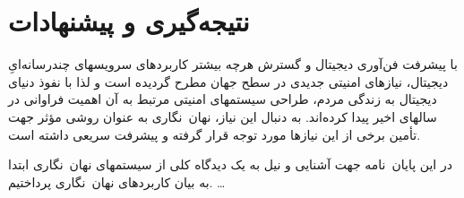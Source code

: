 \chapter{نتیجه‌گیری و پیشنهادات} \label{ch:Conclusion}

با پیشرفت فن‌آوری دیجیتال و گسترش هرچه بیشتر کاربردهای سرویسهای چندرسانه‌ایِ دیجیتال، نیازهای 
امنیتی جدیدی در سطح جهان مطرح گردیده است و لذا با نفوذ دنیای دیجیتال به زندگی مردم، طراحی 
سیستمهای امنیتی مرتبط به آن اهمیت فراوانی در سالهای اخیر پیدا کرده‌اند. به دنبال این نیاز، 
نهان~نگاری به عنوان روشی مؤثر جهت تأمین برخی از این نیازها مورد توجه قرار گرفته و پیشرفت 
سریعی داشته است.

در این پایان~نامه جهت آشنایی و نیل به یک دیدگاه کلی از سیستمهای نهان~نگاری ابتدا به بیان 
کاربردهای نهان~نگاری پرداختیم. \dots
